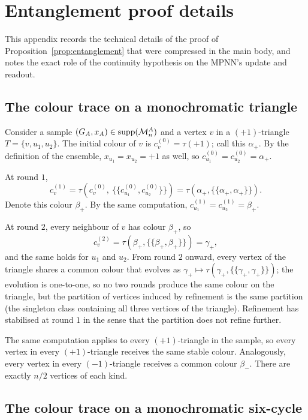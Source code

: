 
\section{Entanglement proof details}\label{app:entangle-proof}

This appendix records the technical details of the proof of
Proposition~\ref{prop:entanglement} that were compressed in the main body, and
notes the exact role of the continuity hypothesis on the MPNN's
update and readout.

\subsection{The colour trace on a monochromatic triangle}

Consider a sample $(G_A, x_A) \in \mathrm{supp}(\mathcal{M}_n^A)$
and a vertex $v$ in a $(+1)$-triangle $T = \{v, u_1, u_2\}$. The
initial colour of $v$ is $c_v^{(0)} = \tau(+1)$; call this $\alpha_+$.
By the definition of the ensemble, $x_{u_1} = x_{u_2} = +1$ as well,
so $c_{u_1}^{(0)} = c_{u_2}^{(0)} = \alpha_+$.

At round $1$,
\[
c_v^{(1)} = \tau\!\left(c_v^{(0)},\ \{\!\{c_{u_1}^{(0)}, c_{u_2}^{(0)}\}\!\}\right) = \tau(\alpha_+, \{\!\{\alpha_+, \alpha_+\}\!\}).
\]
Denote this colour $\beta_+$. By the same computation, $c_{u_1}^{(1)} =
c_{u_2}^{(1)} = \beta_+$.

At round $2$, every neighbour of $v$ has colour $\beta_+$, so
\[
c_v^{(2)} = \tau(\beta_+, \{\!\{\beta_+, \beta_+\}\!\}) = \gamma_+,
\]
and the same holds for $u_1$ and $u_2$. From round $2$ onward, every
vertex of the triangle shares a common colour that evolves as
$\gamma_+ \mapsto \tau(\gamma_+, \{\!\{\gamma_+, \gamma_+\}\!\})$; the
evolution is one-to-one, so no two rounds produce the same colour on
the triangle, but the partition of vertices induced by refinement is
the same partition (the singleton class containing all three vertices
of the triangle). Refinement has stabilised at round $1$ in the sense
that the partition does not refine further.

The same computation applies to every $(+1)$-triangle in the sample,
so every vertex in every $(+1)$-triangle receives the same stable
colour. Analogously, every vertex in every $(-1)$-triangle receives a
common colour $\beta_-$. There are exactly $n/2$ vertices of each
kind.

\subsection{The colour trace on a monochromatic six-cycle}

